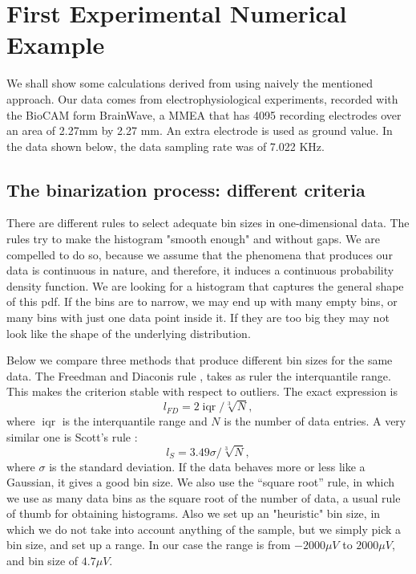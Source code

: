 \documentclass{article}
\DeclareMathOperator{\iqr}{iqr}
\begin{document}
\section{ First Experimental Numerical Example }

We shall show some calculations derived from using naively the mentioned approach. Our data comes from electrophysiological experiments, recorded with the BioCAM form BrainWave, a MMEA that has 4095 recording electrodes over an area of 2.27mm by 2.27 mm. An extra
electrode is used as ground value. In the data shown below, the data sampling rate was of 7.022 KHz.

\subsection{The binarization process: different criteria}

There are different rules to select adequate bin sizes in one-dimensional data. The rules try to make the histogram "smooth enough" and without gaps. We are compelled to do so, because we assume that the phenomena that produces our data is continuous in nature, and therefore, it induces a continuous probability density function. We are looking for a histogram that captures the general shape of this pdf. If the bins are to narrow, we may end up with many empty bins, or many bins with just one data point inside it. If they are too big they may not look like the shape of the underlying distribution.

Below we compare three  methods that produce different bin sizes for the same data.
The Freedman and Diaconis rule \cite{FD1981}, takes as ruler the interquantile
range. This makes the criterion stable with respect to outliers. The exact expression
is
\begin{equation}
  l_{FD}=2 \iqr / \sqrt[3]{N},
\end{equation}
where $\iqr$ is the interquantile range and $N$ is the number of data entries.
A very similar one is Scott's rule \cite{Scott1979}:
\begin{equation}
  l_{S}=3.49 \sigma / \sqrt[3]{N},
\end{equation}
where $\sigma$ is the standard deviation. If the data behaves more or less like a
Gaussian, it gives a good bin size.
We also use the ``square root'' rule, in which we use as many data bins as the
square root of the number of data, a usual rule of thumb for obtaining histograms.
Also we set up an "heuristic" bin size, in which we do not take into account anything of the sample, but we simply pick a bin size, and set up a range. In our case the range is from $-2000 \mu V$ to $2000 \mu V$, and bin size of $4.7 \mu V$.
\end{document}
